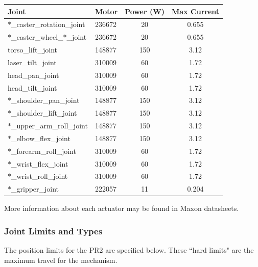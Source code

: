 \begin{tabular}{ll*{2}{c}}
Joint  & Motor & Power (W) & Max Current \\
\hline \hline
$\ast$\_caster\_rotation\_joint       & 236672 & 20  & 0.655 \\
$\ast$\_caster\_wheel\_$\ast$\_joint  & 236672 & 20  & 0.655 \\
torso\_lift\_joint                    & 148877 & 150 & 3.12  \\
laser\_tilt\_joint                    & 310009 & 60  & 1.72  \\
head\_pan\_joint                      & 310009 & 60  & 1.72  \\
head\_tilt\_joint                     & 310009 & 60  & 1.72  \\
$\ast$\_shoulder\_pan\_joint          & 148877 & 150 & 3.12  \\
$\ast$\_shoulder\_lift\_joint         & 148877 & 150 & 3.12  \\
$\ast$\_upper\_arm\_roll\_joint       & 148877 & 150 & 3.12  \\
$\ast$\_elbow\_flex\_joint            & 148877 & 150 & 3.12  \\
$\ast$\_forearm\_roll\_joint          & 310009 & 60  & 1.72  \\
$\ast$\_wrist\_flex\_joint            & 310009 & 60  & 1.72  \\
$\ast$\_wrist\_roll\_joint            & 310009 & 60  & 1.72  \\
$\ast$\_gripper\_joint                & 222057 & 11  & 0.204 \\
\end{tabular}

More information about each actuator may be found in Maxon datasheets.

\subsubsection{Joint Limits and Types}

The position limits for the PR2 are specified below. These ``hard limits" are
the maximum travel for the mechanism.

